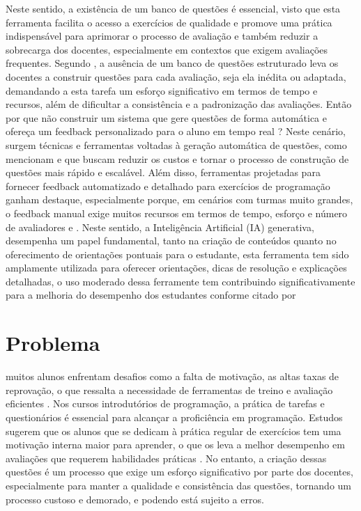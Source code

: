 Neste sentido, a existência de um banco de questões é essencial, visto que esta ferramenta facilita o acesso a exercícios de qualidade e promove uma prática indispensável para aprimorar o processo de avaliação e também reduzir a sobrecarga dos docentes, especialmente em contextos que exigem avaliações frequentes. Segundo   \parencite{Puthiaparampil2020} , a ausência de um banco de questões estruturado leva os docentes a construir questões  para cada avaliação, seja ela inédita ou adaptada,  demandando a esta tarefa um esforço significativo em termos de tempo e recursos, além de dificultar a consistência e a padronização das avaliações. Então por que não construir um sistema que gere questões de forma automática e ofereça um feedback personalizado para o aluno em tempo real ? Neste cenário, surgem técnicas e ferramentas voltadas à geração automática de questões, como mencionam \parencite{kurdi2020} e \parencite{sewunetie2022}  que buscam reduzir os custos e tornar o processo de construção de questões mais rápido e escalável. Além disso, ferramentas projetadas para fornecer feedback automatizado e detalhado para exercícios de programação ganham destaque, especialmente porque, em cenários com turmas muito grandes, o feedback manual exige muitos recursos em termos de tempo, esforço e número de avaliadores \parencite{vanpraet2024} e \parencite{fung2024}.   Neste sentido, a Inteligência Artificial (IA) generativa, desempenha um papel fundamental, tanto na criação de conteúdos quanto no oferecimento de orientações pontuais para o estudante, esta ferramenta tem sido amplamente utilizada para oferecer orientações, dicas de resolução e explicações detalhadas, o uso moderado dessa ferramente tem contribuindo significativamente para a melhoria do desempenho dos estudantes conforme citado por \parencite{yang2024}


\section{Problema}
muitos alunos enfrentam desafios como a falta de motivação, as altas taxas de reprovação, o que ressalta a necessidade de ferramentas de treino e avaliação eficientes \parencite{mbiada2022}. Nos cursos introdutórios de programação, a prática de  tarefas e questionários é essencial para alcançar a proficiência em programação. Estudos sugerem que os alunos que se dedicam à prática regular de exercícios tem uma motivação interna maior para aprender, o que os leva a melhor desempenho em avaliações que requerem habilidades práticas \parencite{Edwards2019}. No entanto, a criação dessas questões é um processo que exige um esforço significativo por parte dos docentes, especialmente para manter a qualidade e consistência das questões, tornando um processo custoso e demorado, e podendo está  sujeito a erros.

